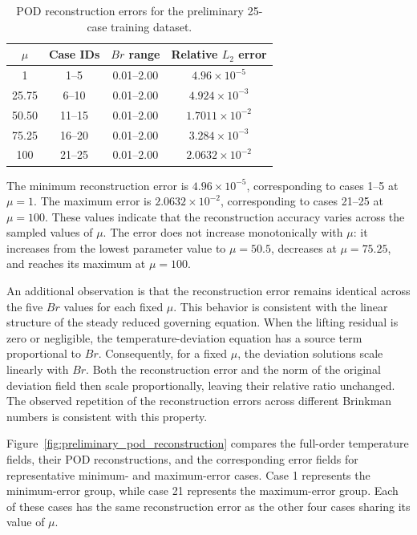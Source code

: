 \begin{table}[htbp]
    \centering
    \caption{POD reconstruction errors for the preliminary
    25-case training dataset.}
    \label{tab:preliminary_pod_errors}
    \begin{tabular}{cccc}
        \toprule
        \textbf{$\mu$} &
        \textbf{Case IDs} &
        \textbf{$Br$ range} &
        \textbf{Relative $L_2$ error} \\
        \midrule
        1      & 1--5   & 0.01--2.00 & $4.96\times10^{-5}$ \\
        25.75  & 6--10  & 0.01--2.00 & $4.924\times10^{-3}$ \\
        50.50  & 11--15 & 0.01--2.00 & $1.7011\times10^{-2}$ \\
        75.25  & 16--20 & 0.01--2.00 & $3.284\times10^{-3}$ \\
        100    & 21--25 & 0.01--2.00 & $2.0632\times10^{-2}$ \\
        \bottomrule
    \end{tabular}
\end{table}

The minimum reconstruction error is
$4.96\times10^{-5}$, corresponding to cases 1--5
at $\mu=1$. The maximum error is
$2.0632\times10^{-2}$, corresponding to cases 21--25
at $\mu=100$. These values indicate that the
reconstruction accuracy varies across the sampled
values of $\mu$. The error does not increase
monotonically with $\mu$: it increases from the
lowest parameter value to $\mu=50.5$, decreases at
$\mu=75.25$, and reaches its maximum at $\mu=100$.

An additional observation is that the reconstruction
error remains identical across the five $Br$ values
for each fixed $\mu$. This behavior is consistent
with the linear structure of the steady reduced
governing equation. When the lifting residual is
zero or negligible, the temperature-deviation
equation has a source term proportional to $Br$.
Consequently, for a fixed $\mu$, the deviation
solutions scale linearly with $Br$. Both the
reconstruction error and the norm of the original
deviation field then scale proportionally, leaving
their relative ratio unchanged. The observed
repetition of the reconstruction errors across
different Brinkman numbers is consistent with
this property.

Figure~\ref{fig:preliminary_pod_reconstruction}
compares the full-order temperature fields, their
POD reconstructions, and the corresponding error
fields for representative minimum- and
maximum-error cases. Case 1 represents the
minimum-error group, while case 21 represents
the maximum-error group. Each of these cases has
the same reconstruction error as the other four
cases sharing its value of $\mu$.

